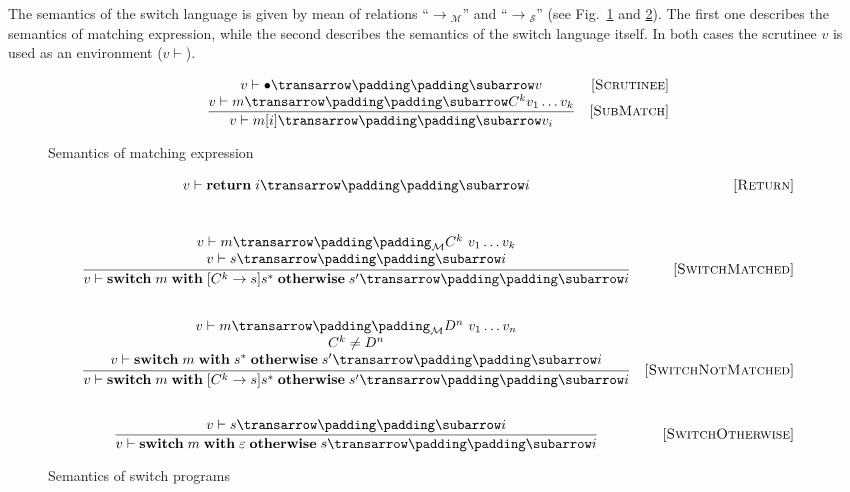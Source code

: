 The semantics of the switch language is given by mean of relations ``$\xrightarrow{}{}_{\!\!\!\mathcal M}$'' and ``$\xrightarrow{}{}_{\!\!\mathcal S}$''
(see Fig.~\ref{fig:matchexpr} and \ref{fig:test-and-branch}). The first one describes the semantics of matching expression, while
the second describes the semantics of the switch language itself. In both cases the scrutinee $v$ is used as an environment ($v\vdash$).


\begin{figure}[t]
  \renewcommand*{\arraystretch}{2}
  \setarrow{\xrightarrow}
  \[
  \begin{array}{cr}
    \withenv{v}{\trans{\bullet}{}{v}} & \ruleno{Scrutinee} \\
    \trule{\withenv{v}{\trans{m}{}{C^k v_1\dots v_k}}}{\withenv{v}{\trans{m[i]}{}{v_i}}} & \ruleno{SubMatch} 
  \end{array}
  \]
  \caption{Semantics of matching expression}
  \label{fig:matchexpr}
\end{figure}

\begin{figure}[t]
  \setarrow{\xrightarrow}
  \[
  \begin{array}{cr}
    \withenv{v}{\trans{\primi{return}\;i}{}{i}} & \ruleno{Return}\\[10mm]
    
    \trule{\renewcommand*{\arraystretch}{1}
           \begin{array}{c}        
              {\setsubarrow{_{\mathcal M}}\withenv{v}{\trans{m}{}{C^k\ v_1 \dots v_k}}} \\
              \withenv{v}{\trans{s}{}{i}}
           \end{array}
          }    
          {\withenv{v}{\trans{\primi{switch}\;m\;\primi{with}\;[C^k\to s]s^*\;\primi{otherwise}\;s^\prime}{}{i}}} & \ruleno{SwitchMatched}\\[10mm]
          
    \trule{\renewcommand*{\arraystretch}{1}
           \begin{array}{c}        
             {\setsubarrow{_{\mathcal M}}\withenv{v}{\trans{m}{}{D^n\  v_1 \dots v_n}}}\\
             C^k\ne D^n\\
             \withenv{v}{\trans{\primi{switch}\;m\;\primi{with}\;s^*\;\primi{otherwise}\;s^\prime}{}{i}}
           \end{array}
          }
          {\withenv{v}{\trans{\primi{switch}\;m\;\primi{with}\;[C^k\to s]s^*\;\primi{otherwise}\;s^\prime}{}{i}}} & \ruleno{SwitchNotMatched}\\[10mm]
          
    \trule{\withenv{v}{\trans{s}{}{i}}}{\withenv{v}{\trans{\primi{switch}\;m\;\primi{with}\;\varepsilon\;\primi{otherwise}\;s}{}{i}}} & \ruleno{SwitchOtherwise}
  \end{array}
  \]
  \caption{Semantics of switch programs}
  \label{fig:test-and-branch}
\end{figure}


